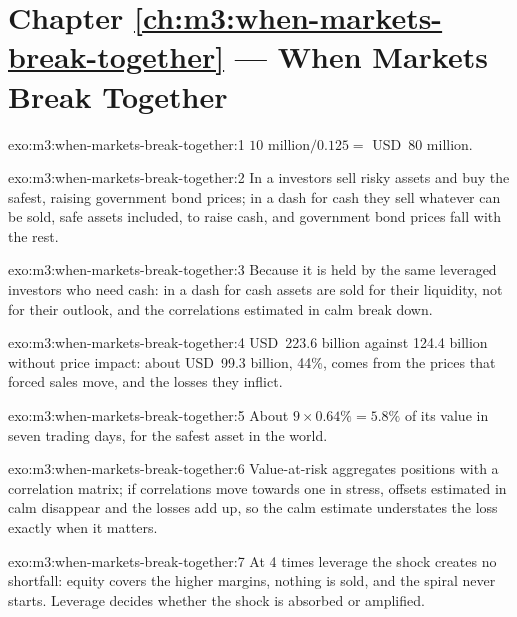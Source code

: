\section*{Chapter \ref{ch:m3:when-markets-break-together} --- When Markets Break Together}

\begin{solution}{exo:m3:when-markets-break-together:1}
$10\text{ million}/0.125 = $ USD~80 million.
\end{solution}

\begin{solution}{exo:m3:when-markets-break-together:2}
In a  investors sell risky assets and buy the safest, raising government bond prices; in a dash for cash they sell whatever can be
sold, safe assets included, to raise cash, and government bond prices fall with the rest.
\end{solution}

\begin{solution}{exo:m3:when-markets-break-together:3}
Because it is held by the same leveraged investors who need cash: in a dash for cash assets are sold for their liquidity, not for their outlook, and
the correlations estimated in calm break down.
\end{solution}

\begin{solution}{exo:m3:when-markets-break-together:4}
USD~223.6 billion against 124.4 billion without price impact: about USD~99.3 billion, 44\%, comes from the prices that forced sales move, and the losses
they inflict.
\end{solution}

\begin{solution}{exo:m3:when-markets-break-together:5}
About $9 \times 0.64\% = 5.8\%$ of its value in seven trading days, for the safest asset in the world.
\end{solution}

\begin{solution}{exo:m3:when-markets-break-together:6}
Value-at-risk aggregates positions with a correlation matrix; if correlations move towards one in stress, offsets estimated in calm disappear and the
losses add up, so the calm estimate understates the loss exactly when it matters.
\end{solution}

\begin{solution}{exo:m3:when-markets-break-together:7}
At 4 times leverage the shock creates no shortfall: equity covers the higher margins, nothing is sold, and the spiral never starts. Leverage decides
whether the shock is absorbed or amplified.
\end{solution}

